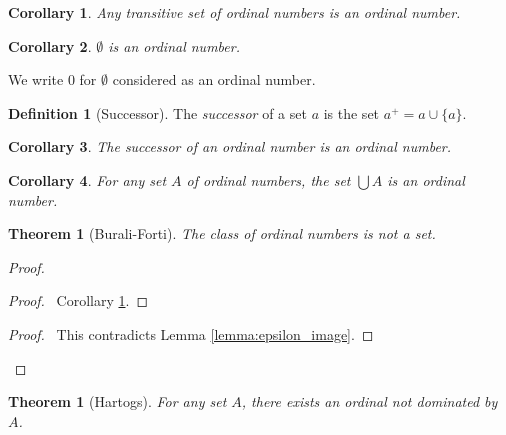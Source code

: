 \documentclass{article}
\let\qed\relax
\newtheorem{theorem}[axiom]{Theorem}
\newtheorem{corollary}{Corollary}[axiom]
\theoremstyle{definition}
\newtheorem{definition}[axiom]{Definition}
\begin{document}
    \begin{corollary}
        \label{corollary:set_of_ordinals}
        Any transitive set of ordinal numbers is an ordinal number.
    \end{corollary}

    \begin{corollary}
        $\emptyset$ is an ordinal number.
    \end{corollary}

    We write 0 for $\emptyset$ considered as an ordinal number.

    \begin{definition}[Successor]
        The \emph{successor} of a set $a$ is the set $a^+ = a \cup \{ a \}$.
    \end{definition}

    \begin{corollary}
        The successor of an ordinal number is an ordinal number.
    \end{corollary}

    \begin{corollary}
        For any set $A$ of ordinal numbers, the set $\bigcup A$ is an ordinal number.
    \end{corollary}

    \begin{theorem}[Burali-Forti]
        The class of ordinal numbers is not a set.
    \end{theorem}

    \begin{proof}
        \pf
        \begin{proof}
            \pf\ Corollary \ref{corollary:set_of_ordinals}.
        \end{proof}
        \qedstep
        \begin{proof}
            \pf\ This contradicts Lemma \ref{lemma:epsilon_image}.
        \end{proof}
        \qed
    \end{proof}

    \begin{theorem}[Hartogs]
        For any set $A$, there exists an ordinal not dominated by $A$.
    \end{theorem}
\end{document}
